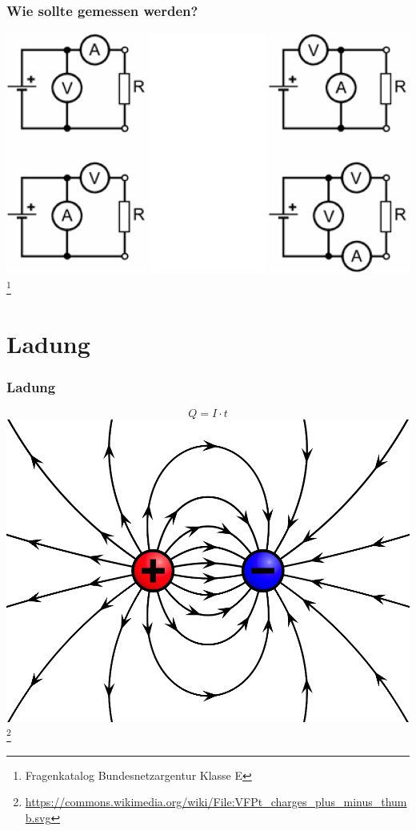 \begin{frame}
    \frametitle{Wie sollte gemessen werden?}
        \includegraphics[width=1\textwidth]{e02/stromSpannung.png}
        \footnote{\tiny Fragenkatalog Bundesnetzargentur Klasse E}
\end{frame}

\section*{Ladung}

\begin{frame}
    \frametitle{Ladung}
    \begin{center}
    		$$Q = I \cdot t$$
        \includegraphics[width=.8\textwidth]{e02/ladung.png}
        \footnote{\tiny \url{https://commons.wikimedia.org/wiki/File:VFPt_charges_plus_minus_thumb.svg}}
	\end{center}
\end{frame}

